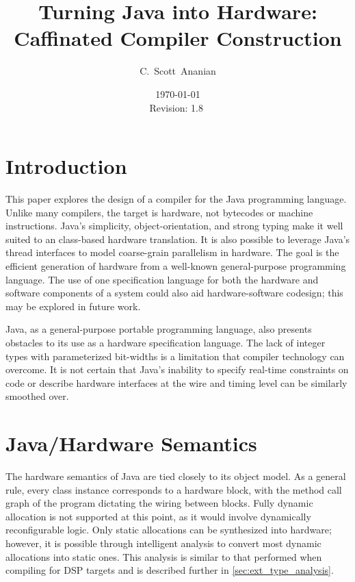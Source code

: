 \documentclass[11pt,notitlepage,twocolumn]{article}
\author{C.~Scott~Ananian}
\title{Turning Java into Hardware: \\ Caffinated Compiler Construction}
\date{\today \\ $ $Revision: 1.8 $ $}
\begin{document}

\maketitle

\section{Introduction}
This paper explores the design of a compiler for the Java
programming language.  Unlike many compilers, the target is hardware,
not bytecodes or machine instructions.
Java's simplicity, object-orientation, and
strong typing make it well suited to an class-based hardware
translation.  It is also possible to leverage Java's thread interfaces
to model coarse-grain parallelism in hardware.  The goal is the
efficient generation of hardware from a well-known general-purpose
programming language.  The use of one specification language for both
the hardware and software components of a system could also aid
hardware-software codesign; this may be explored in future work.

Java, as a general-purpose portable programming language, also
presents obstacles to its use as a hardware specification language.
The lack of integer types with parameterized bit-widths is a
limitation that compiler technology can overcome.  It is not certain
that Java's inability to specify real-time constraints on code or
describe hardware interfaces at the wire and timing level can be
similarly smoothed over.

\section{Java/Hardware Semantics}
The hardware semantics of Java are tied closely to its object model.
As a general rule, every class instance corresponds to a hardware
block, with the method call graph of the program dictating the wiring
between blocks.  Fully dynamic allocation is not supported at this
point, as it would involve dynamically reconfigurable logic.  Only
static allocations can be synthesized into hardware; however, it is
possible through intelligent analysis to convert most dynamic
allocations into static ones.  This analysis is similar to that
performed when compiling for DSP targets \cite{DSP_targets} and is
described further in \ref{sec:ext_type_analysis}.
\end{document}
